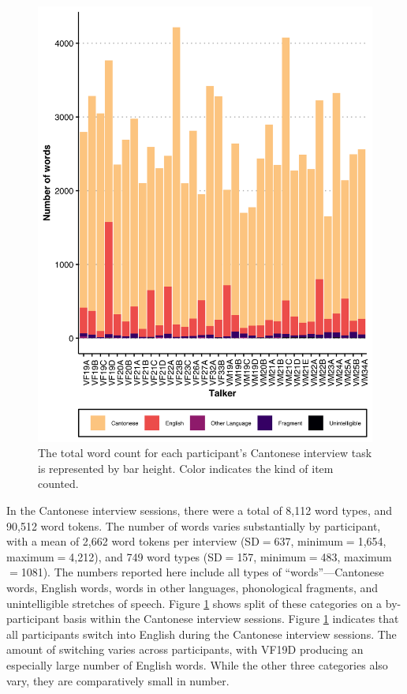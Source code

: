 \begin{figure}[!htbp]
  \begin{center}
  \includegraphics[width=4.9in]{figures/ch2_cantonesetypecounts_5in.png} 
  \caption{The total word count for each participant's Cantonese interview task is represented by bar height. Color indicates the kind of item counted. }
  \label{ch2:fig:cantonesetypecounts}
  \end{center}
\end{figure}

In the Cantonese interview sessions, there were a total of 8,112 word types, and 90,512 word tokens. The number of words varies substantially by participant, with a mean of 2,662 word tokens per interview (SD$=$637, minimum$=$1,654, maximum$=$4,212), and 749 word types (SD$=$157, minimum$=$483, maximum$=$1081). The numbers reported here include all types of ``words''---Cantonese words, English words, words in other languages, phonological fragments, and unintelligible stretches of speech. Figure \ref{ch2:fig:cantonesetypecounts} shows split of these categories on a by-participant basis within the Cantonese interview sessions. Figure \ref{ch2:fig:cantonesetypecounts} indicates that all participants switch into English during the Cantonese interview sessions. The amount of switching varies across participants, with VF19D producing an especially large number of English words. While the other three categories also vary, they are comparatively small in number. 


